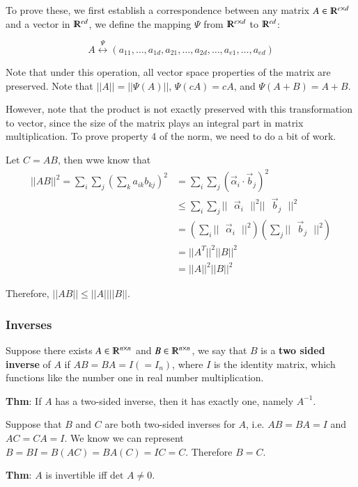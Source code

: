 \documentclass [12 pt, twoside] {book}
\newcommand\+{\text{ }}
\newcommand{\det}{\text{det }}
\begin{document}
To prove these, we first establish a correspondence between any matrix $A \in
\varmathbb{R}^{e \times d}$ and a vector in $\varmathbb{R}^{ed}$, we define the
mapping $\Psi$ from $\varmathbb{R}^{e \times d}$ to $\varmathbb{R}^{ed}$:

\[
    A \overset{\Psi}{\longleftrightarrow} (a_{11}, \dots, a_{1d}, a_{21}, \dots,
    a_{2d}, \dots, a_{e1}, \dots, a_{ed})
\]

Note that under this operation, all vector space properties of the matrix are
preserved. Note that $||A|| = ||\Psi(A)||$, $\Psi(cA) = cA$, and $\Psi(A + B) =
A + B$.

However, note that the product is not exactly preserved with this transformation
to vector, since the size of the matrix plays an integral part in matrix
multiplication. To prove property 4 of the norm, we need to do a bit of work.

Let $C = AB$, then wwe know that
\begin{align*}
    ||AB||^2 = \sum_i \sum_j \left(\sum_k a_{ik}b_{kj}\right)^2 &= \sum_i \sum_j
    (\vec{\alpha}_i \cdot \vec{b}_j)^2 \\
    &\leq \sum_i \sum_j ||\+\vec{\alpha}_i\+||^2 ||\+\vec{b}_j\+||^2\\
    &= (\sum_i ||\+\vec{\alpha}_i\+||^2)(\sum_j ||\+\vec{b}_j\+||^2)\\
    &= ||A^T||^2 ||B||^2\\
    &= ||A||^2 ||B||^2
\end{align*}

Therefore, $||AB|| \leq ||A|| ||B||$.

\subsubsection{Inverses}

Suppose there exists $A \in \varmathbb{R}^{n \times n}$ and $B \in
\varmathbb{R}^{n \times n}$, we say that $B$ is a \textbf{two sided inverse} of
$A$ if $AB = BA = I (= I_n)$, where $I$ is the identity matrix, which functions
like the number one in real number multiplication.

\textbf{Thm}: If $A$ has a two-sided inverse, then it has exactly one, namely
$A^{-1}$.

Suppose that $B$ and $C$ are both two-sided inverses for $A$, i.e. $AB = BA = I$
and $AC = CA = I$. We know we can represent $B = BI = B(AC) = BA(C) = IC = C$.
Therefore $B = C$.

\textbf{Thm}: $A$ is invertible iff $\det A \neq 0$.
\end{document}
